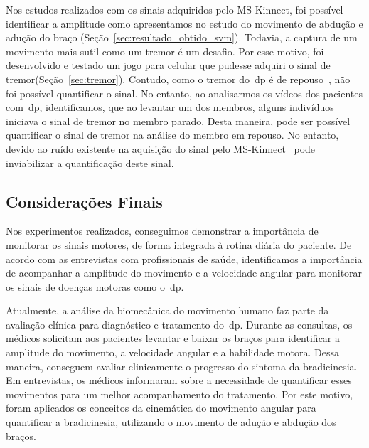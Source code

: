 Nos estudos realizados com os sinais adquiridos pelo MS-Kinnect, foi possível identificar a amplitude como apresentamos no estudo do movimento de abdução e adução do braço (Seção~\ref{sec:resultado_obtido_svm}). Todavia, a captura de um movimento mais sutil como um tremor é um desafio. Por esse motivo, foi desenvolvido e testado um jogo para celular que pudesse adquiri o sinal de tremor(Seção~\ref{sec:tremor}). Contudo, como o tremor do~\ac{dp} é de repouso~\cite{protpar010}, não foi possível quantificar o sinal. No entanto, ao analisarmos os vídeos dos pacientes com~\ac{dp}, identificamos, que ao levantar um dos membros, alguns indivíduos iniciava o sinal de tremor no membro parado. Desta maneira, pode ser possível quantificar o sinal de tremor na análise do membro em repouso. No entanto, devido ao ruído existente na aquisição do sinal pelo MS-Kinnect~\cite{kinnect2013} pode inviabilizar a quantificação deste sinal.

\subsection{Considerações Finais}\label{sec:cons_finais}

Nos experimentos realizados, conseguimos demonstrar a importância de monitorar os sinais motores, de forma integrada à rotina diária do paciente. De acordo com as entrevistas com profissionais de saúde, identificamos a importância de acompanhar a amplitude do movimento e a velocidade angular para monitorar os sinais de doenças motoras como o~\ac{dp}.

Atualmente, a análise da biomecânica do movimento humano faz parte da avaliação clínica para diagnóstico e tratamento do~\ac{dp}. Durante as consultas, os médicos solicitam aos pacientes levantar e baixar os braços para identificar a amplitude do movimento, a velocidade angular e a habilidade motora. Dessa maneira, conseguem avaliar clinicamente o progresso do sintoma da bradicinesia. Em entrevistas, os médicos informaram sobre a necessidade de quantificar esses movimentos para um melhor acompanhamento do tratamento. Por este motivo, foram aplicados os conceitos da cinemática do movimento angular para quantificar a bradicinesia, utilizando o movimento de adução e abdução dos braços.

